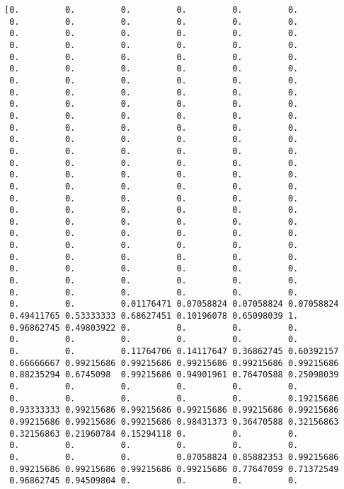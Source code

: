 \documentclass[11pt]{article}
\begin{document}
    \begin{Verbatim}[commandchars=\\\{\}]
[0.         0.         0.         0.         0.         0.
 0.         0.         0.         0.         0.         0.
 0.         0.         0.         0.         0.         0.
 0.         0.         0.         0.         0.         0.
 0.         0.         0.         0.         0.         0.
 0.         0.         0.         0.         0.         0.
 0.         0.         0.         0.         0.         0.
 0.         0.         0.         0.         0.         0.
 0.         0.         0.         0.         0.         0.
 0.         0.         0.         0.         0.         0.
 0.         0.         0.         0.         0.         0.
 0.         0.         0.         0.         0.         0.
 0.         0.         0.         0.         0.         0.
 0.         0.         0.         0.         0.         0.
 0.         0.         0.         0.         0.         0.
 0.         0.         0.         0.         0.         0.
 0.         0.         0.         0.         0.         0.
 0.         0.         0.         0.         0.         0.
 0.         0.         0.         0.         0.         0.
 0.         0.         0.         0.         0.         0.
 0.         0.         0.         0.         0.         0.
 0.         0.         0.         0.         0.         0.
 0.         0.         0.         0.         0.         0.
 0.         0.         0.         0.         0.         0.
 0.         0.         0.         0.         0.         0.
 0.         0.         0.01176471 0.07058824 0.07058824 0.07058824
 0.49411765 0.53333333 0.68627451 0.10196078 0.65098039 1.
 0.96862745 0.49803922 0.         0.         0.         0.
 0.         0.         0.         0.         0.         0.
 0.         0.         0.11764706 0.14117647 0.36862745 0.60392157
 0.66666667 0.99215686 0.99215686 0.99215686 0.99215686 0.99215686
 0.88235294 0.6745098  0.99215686 0.94901961 0.76470588 0.25098039
 0.         0.         0.         0.         0.         0.
 0.         0.         0.         0.         0.         0.19215686
 0.93333333 0.99215686 0.99215686 0.99215686 0.99215686 0.99215686
 0.99215686 0.99215686 0.99215686 0.98431373 0.36470588 0.32156863
 0.32156863 0.21960784 0.15294118 0.         0.         0.
 0.         0.         0.         0.         0.         0.
 0.         0.         0.         0.07058824 0.85882353 0.99215686
 0.99215686 0.99215686 0.99215686 0.99215686 0.77647059 0.71372549
 0.96862745 0.94509804 0.         0.         0.         0.

\end{Verbatim}
\end{document}
